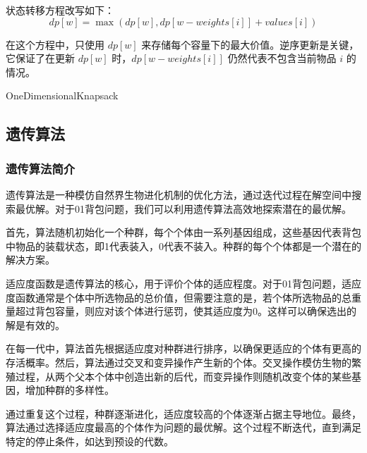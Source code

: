 \documentclass[UTF8,titlepage]{ctexart}
\numberwithin{figure}{section}
\begin{document}
状态转移方程改写如下：
\begin{equation}
    dp[w] = \max(dp[w], dp[w-weights[i]] + values[i])
\end{equation}

在这个方程中，只使用 $dp[w]$ 来存储每个容量下的最大价值。逆序更新是关键，它保证了在更新 $dp[w]$ 时，$dp[w-weights[i]]$ 仍然代表不包含当前物品 $i$ 的情况。

\begin{algorithm}[H]
    \SetAlgoLined
    \DontPrintSemicolon
    \caption{OneDimensionalKnapsack}
    \end{algorithm}


\subsection{遗传算法}

\subsubsection{遗传算法简介}
遗传算法是一种模仿自然界生物进化机制的优化方法，通过迭代过程在解空间中搜索最优解。对于01背包问题，我们可以利用遗传算法高效地探索潜在的最优解。

首先，算法随机初始化一个种群，每个个体由一系列基因组成，这些基因代表背包中物品的装载状态，即1代表装入，0代表不装入。种群的每个个体都是一个潜在的解决方案。

适应度函数是遗传算法的核心，用于评价个体的适应程度。对于01背包问题，适应度函数通常是个体中所选物品的总价值，但需要注意的是，若个体所选物品的总重量超过背包容量，则应对该个体进行惩罚，使其适应度为0。这样可以确保选出的解是有效的。

在每一代中，算法首先根据适应度对种群进行排序，以确保更适应的个体有更高的存活概率。然后，算法通过交叉和变异操作产生新的个体。交叉操作模仿生物的繁殖过程，从两个父本个体中创造出新的后代，而变异操作则随机改变个体的某些基因，增加种群的多样性。

通过重复这个过程，种群逐渐进化，适应度较高的个体逐渐占据主导地位。最终，算法通过选择适应度最高的个体作为问题的最优解。这个过程不断迭代，直到满足特定的停止条件，如达到预设的代数。
\end{document}
